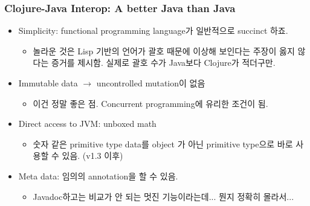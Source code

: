 \begin{frame}
\frametitle{Clojure-Java Interop: A better Java than Java}

\begin{itemize}
\item Simplicity: functional programming language가 일반적으로 succinct 하죠.
  \begin{itemize}
  \item 놀라운 것은 Lisp 기반의 언어가 괄호 때문에 이상해 보인다는
    주장이 옳지 않다는 증거를 제시함. 실제로 괄호 수가 Java보다
    Clojure가 적더구만.
  \end{itemize}

\item Immutable data $\rightarrow$ uncontrolled mutation이 없음
  \begin{itemize}
  \item 이건 정말 좋은 점. Concurrent programming에 유리한 조건이 됨.
  \end{itemize}

\item Direct access to JVM: unboxed math
  \begin{itemize}
  \item 숫자 같은 primitive type data를 object 가 아닌 primitive
    type으로 바로 사용할 수 있음. (v1.3 이후)
  \end{itemize}

\item Meta data: 임의의 annotation을 할 수 있음.
  \begin{itemize}
  \item Javadoc하고는 비교가 안 되는 멋진 기능이라는데... 뭔지 정확히
    몰라서...
  \end{itemize}
\end{itemize}

\end{frame}
